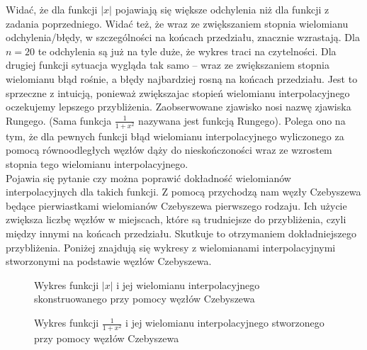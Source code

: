 \documentclass[]{article}
\begin{document}
Widać, że dla funkcji $|x|$ pojawiają się większe odchylenia niż dla funkcji z zadania poprzedniego. Widać też, że wraz ze zwiększaniem stopnia wielomianu odchylenia/błędy, w szczególności na końcach przedziału, znacznie wzrastają. Dla $n=20$ te odchylenia są już na tyle duże, że wykres traci na czytelności. Dla drugiej funkcji sytuacja wygląda tak samo -- wraz ze zwiększaniem stopnia wielomianu błąd rośnie, a błędy najbardziej rosną na końcach przedziału. Jest to sprzeczne z intuicją, ponieważ zwiększajac stopień wielomianu interpolacyjnego oczekujemy lepszego przybliżenia. Zaobserwowane zjawisko nosi nazwę zjawiska Rungego. (Sama funkcja $\frac{1}{1+x^2}$ nazywana jest funkcją Rungego). Polega ono na tym, że dla pewnych funkcji błąd wielomianu
interpolacyjnego wyliczonego za pomocą równoodległych węzłów dąży do nieskończoności wraz ze
wzrostem stopnia tego wielomianu interpolacyjnego.\\
Pojawia się pytanie czy można poprawić dokładność wielomianów interpolacyjnych dla takich funkcji. Z pomocą przychodzą nam węzły Czebyszewa będące pierwiastkami wielomianów Czebyszewa pierwszego rodzaju. Ich użycie zwiększa liczbę węzłów w miejscach, które są trudniejsze do przybliżenia, czyli między innymi na końcach przedziału. Skutkuje to otrzymaniem dokładniejszego przybliżenia. Poniżej znajdują się wykresy z wielomianami interpolacyjnymi stworzonymi na podstawie węzłów Czebyszewa.

\begin{figure}[h]
	\centering
	 \hfill
	 \hfill
	 \hfill
	 \hfill
	\caption*{Wykres funkcji $|x|$ i jej wielomianu interpolacyjnego skonstruowanego przy pomocy węzłów Czebyszewa}
	\label{fig:4}
\end{figure}
\begin{figure}[h]
	\centering
	 \hfill
	 \hfill
	 \hfill
	 \hfill
	\caption*{Wykres funkcji $\frac{1}{1+x^2}$ i jej wielomianu interpolacyjnego stworzonego przy pomocy węzłów Czebyszewa}
	\label{fig:4}
\end{figure}
\end{document}
